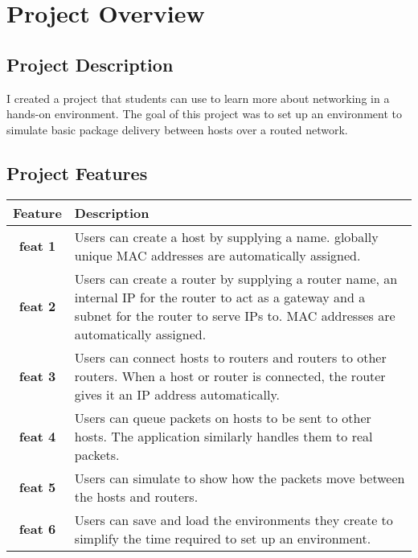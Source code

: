 \documentclass{assignment-x}
\begin{document}
\maketitle
\pagebreak

\section{Project Overview}
\subsection{Project Description}
I created a project that students can use to learn more about networking in a hands-on environment.
The goal of this project was to set up an environment to simulate basic package delivery between hosts over a routed network.

\subsection{Project Features}
\begin{table}[htbp]
    \centering
    \begin{tabularx}{\textwidth}{cX}
        \hline
        \textbf{Feature} & \textbf{Description}                                                                                                                                                                           \\ \hline
        \textbf{feat 1}  & Users can create a host by supplying a name. globally unique MAC addresses are automatically assigned.                                                                                         \\ \hline
        \textbf{feat 2}  & Users can create a router by supplying a router name, an internal IP for the router to act as a gateway and a subnet for the router to serve IPs to. MAC addresses are automatically assigned. \\ \hline
        \textbf{feat 3}  & Users can connect hosts to routers and routers to other routers. When a host or router is connected, the router gives it an IP address automatically.                                          \\ \hline
        \textbf{feat 4}  & Users can queue packets on hosts to be sent to other hosts. The application similarly handles them to real packets.                                                                            \\ \hline
        \textbf{feat 5}  & Users can simulate to show how the packets move between the hosts and routers.                                                                                                                 \\ \hline
        \textbf{feat 6}  & Users can save and load the environments they create to simplify the time required to set up an environment.                                                                                   \\ \hline
    \end{tabularx}
    \label{tab:project_features}
\end{table}
\end{document}
